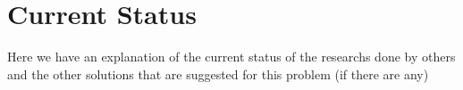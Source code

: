 \chapter{Current Status}
Here we have an explanation of the current status of the researchs done by others and the other solutions 
that are suggested for this problem (if there are any)